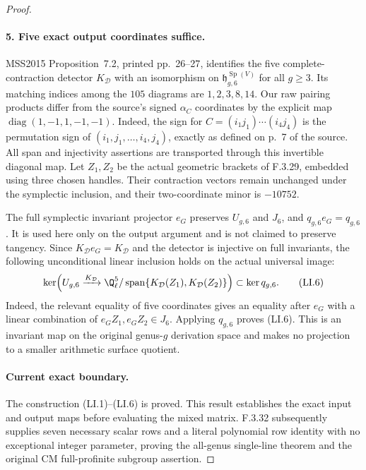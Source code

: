 \begin{proof}
\paragraph{5. Five exact output coordinates suffice.}
MSS2015 Proposition~7.2, printed pp.~26--27\cite{AuditMoritaSakasaiSuzuki2015v2}, identifies
the five complete-contraction detector $K_{\mathcal D}$
with an isomorphism on
$\mathfrak h_{g,6}^{\operatorname{Sp}(V)}$ for all $g\geq3$.
Its matching indices among the $105$ diagrams are
$1,2,3,8,14$. Our raw pairing products differ from the
source's signed $\alpha_C$ coordinates by the explicit map
$\operatorname{diag}(1,-1,1,-1,-1)$. Indeed, the sign for
$C=(i_1j_1)\cdots(i_4j_4)$ is the permutation sign of
$(i_1,j_1,\ldots,i_4,j_4)$, exactly as defined on p.~7
of the source. All span and injectivity assertions are
transported through this invertible diagonal map. Let $Z_1,Z_2$ be the actual geometric
brackets of F.3.29, embedded using three chosen handles.
Their contraction vectors remain unchanged under the
symplectic inclusion, and their two-coordinate minor
is $-10752$.

The full symplectic invariant projector $e_G$ preserves
$U_{g,6}$ and $J_6$, and $q_{g,6}e_G=q_{g,6}$.
It is used here only on the output argument and is not
claimed to preserve tangency. Since $K_{\mathcal D}e_G
=K_{\mathcal D}$ and the detector is injective on full
invariants, the following unconditional linear inclusion
holds on the actual universal image:
\[
 \ker\!\left(U_{g,6}\xrightarrow{K_{\mathcal D}}
  \Q_\ell^5/\operatorname{span}\{K_{\mathcal D}(Z_1),
                                      K_{\mathcal D}(Z_2)\}\right)
                 \subset\ker q_{g,6}.                    \tag{LI.6}
\]
Indeed, the relevant equality of five coordinates gives
an equality after $e_G$ with a linear combination of
$e_GZ_1,e_GZ_2\in J_6$. Applying $q_{g,6}$ proves (LI.6).
This is an invariant map on the original genus-$g$
derivation space and makes no projection to a smaller
arithmetic surface quotient.

\paragraph{Current exact boundary.}
The construction (LI.1)--(LI.6) is proved. This result establishes
the exact input and output maps before evaluating the mixed matrix.
F.3.32 subsequently supplies seven necessary scalar rows and a
literal polynomial row identity with no exceptional integer
parameter, proving the all-genus single-line theorem and the
original CM full-profinite subgroup assertion.

\end{proof}



